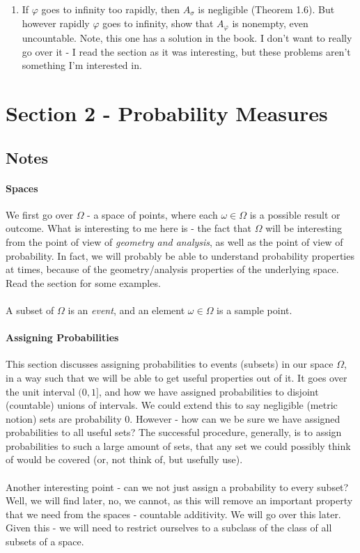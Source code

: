 \documentclass[12pt,a4paper]{article}
\newcommand{\1}[1]{\mathbbm{1}\left\{ #1 \right\}}
\begin{document}
\begin{enumerate}
	\item If $\varphi$ goes to infinity too rapidly, then $A_\sigma$ is negligible (Theorem 1.6). But however rapidly $\varphi$ goes to infinity, show that $A_\varphi$ is nonempty, even uncountable.  Note, this one has a solution in the book. I don't want to really go over it - I read the section as it was interesting, but these problems aren't something I'm interested in.
	
\end{enumerate}


\section{Section 2 - Probability Measures}
\subsection{Notes}
\paragraph{Spaces} We first go over $\Omega$ - a space of points, where each $\omega \in \Omega$ is a possible result or outcome. What is interesting to me here is - the fact that $\Omega$ will be interesting from the point of view of \textit{geometry and analysis}, as well as the point of view of probability. In fact, we will probably be able to understand probability properties at times, because of the geometry/analysis properties of the underlying space. Read the section for some examples.
\\\\
A subset of $\Omega$ is an \textit{event}, and an element $\omega \in \Omega$ is a sample point.

\paragraph{Assigning Probabilities} This section discusses assigning probabilities to events (subsets) in our space $\Omega$, in a way such that we will be able to get useful properties out of it. It goes over the unit interval $(0,1]$, and how we have assigned probabilities to disjoint (countable) unions of intervals. We could extend this to say negligible (metric notion) sets are probability $0$. However - how can we be sure we have assigned probabilities to all useful sets? The successful procedure, generally, is to assign probabilities to such a large amount of sets, that any set we could possibly think of would be covered (or, not think of, but usefully use).
\\\\
Another interesting point - can we not just assign a probability to every subset? Well, we will find later, no, we cannot, as this will remove an important property that we need from the spaces - countable additivity. We will go over this later. Given this - we will need to restrict ourselves to a subclass of the class of all subsets of a space.
\end{document}
